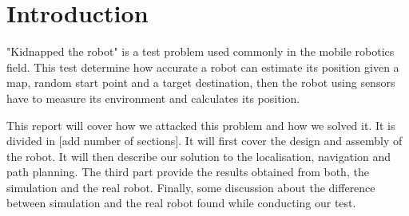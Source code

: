\section{Introduction}

"Kidnapped the robot" is a test problem used commonly in the mobile robotics field. This test determine how accurate a robot can estimate its position given a map, random start point and a target destination, then the robot using sensors have to measure its environment and calculates its position. 

This report will cover how we attacked this problem and how we solved it. It is divided in [add number of sections]. It will first cover the design and assembly of the robot. It will then describe our solution to the localisation, navigation and path planning. The third part provide the results obtained from both, the simulation and the real robot. Finally, some discussion about the difference between simulation and the real robot found while conducting our test.

